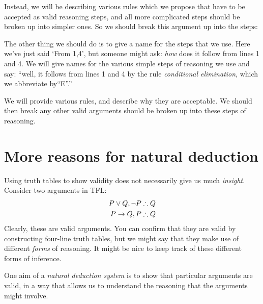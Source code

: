 Instead, we will be describing various rules which we propose that have to be accepted as valid reasoning steps, and all more complicated steps should be broken up into simpler ones. So we should break this argument up into the steps:
 \begin{pf}
 \end{pf}

The other thing we should do is to give a name for the steps that we use. Here we've just said `From 1,4', but someone might ask: \emph{how} does it follow from lines 1 and 4. We will give names for the various simple steps of reasoning we use and say: ``well, it follows from lines 1 and 4 by the rule \emph{conditional elimination}, which we abbreviate by``\eif E''.''
 \begin{pf}
 \end{pf}

We will provide various rules, and describe why they are acceptable. We should then break any other valid arguments should be broken up into these steps of reasoning.



\section{More reasons for natural deduction}


Using truth tables to show validity does not necessarily give us much \emph{insight}. Consider two arguments in TFL:
	\begin{align*}
		P \eor Q, \enot P & \therefore Q\\
		P \eif Q, P & \therefore Q
	\end{align*}
Clearly, these are valid arguments. You can confirm that they are valid by constructing four-line truth tables, but we might say that they make use of different \emph{forms} of reasoning. It might be nice to keep track of these different forms of inference.

One aim of a \emph{natural deduction system} is to show that particular arguments are valid, in a way that allows us to understand the reasoning that the arguments might involve.

